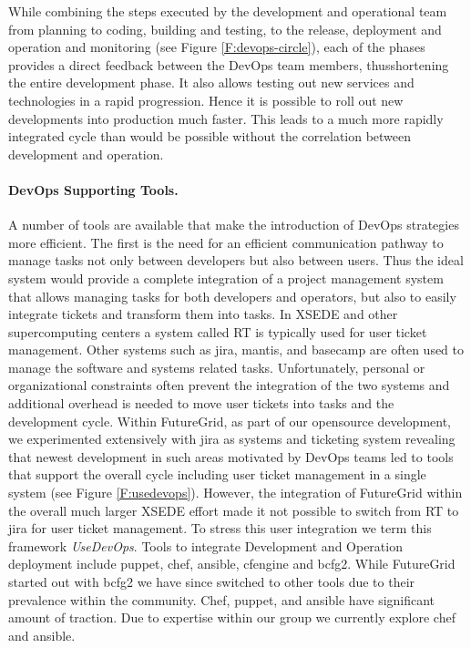 \documentclass{article}
\begin{document}
While combining the steps executed by the development and operational team from planning to coding, building and testing, to the release, deployment and operation and monitoring (see Figure \ref{F:devops-circle}), each of the phases provides a direct feedback between the DevOps team members, thusshortening the entire development phase. It also allows testing out new services and technologies in a rapid progression. Hence it is possible to roll out new developments into production much faster. This leads to a much more rapidly integrated cycle than would be possible without the correlation between development and operation.


\paragraph{DevOps Supporting Tools.}


A number of tools are available that make the introduction of DevOps strategies more efficient. The first is the need for an efficient communication pathway to manage tasks not only between developers but also between users. Thus the ideal system would provide a complete integration of a project management system that allows managing tasks for both developers and operators, but also to easily integrate tickets and transform them into tasks. In XSEDE and other supercomputing centers a system called RT \cite{www-rt} is typically used for user ticket management. Other systems such as jira, mantis, and basecamp are often used to manage the software and systems related tasks. Unfortunately, personal or organizational constraints often prevent the integration of the two systems and additional overhead is needed to move user tickets into tasks and the development cycle. Within FutureGrid, as part of our opensource development, we experimented extensively with jira as systems and ticketing system \cite{www-jira-ticket} revealing that newest development in such areas motivated by DevOps teams led to tools that support the overall cycle including user ticket management in a single system (see Figure \ref{F:usedevops}). However, the integration of FutureGrid within the overall much larger XSEDE effort made it not possible to switch from RT to jira for user ticket management. To stress this user integration we term this framework {\em UseDevOps}. Tools to integrate Development and Operation deployment include puppet, chef, ansible, cfengine and bcfg2. While FutureGrid started out with bcfg2 we have since  switched to other tools due to their prevalence within the community. Chef, puppet, and ansible have significant amount of traction. Due to expertise within our group we currently explore chef and ansible.
\end{document}
